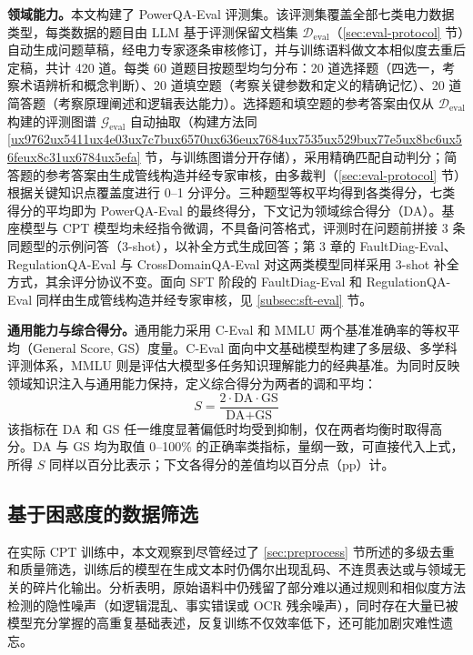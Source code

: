 \documentclass[fontset=fandol,type=master,campus=shenzhen,etitleauto=true]{hithesisbook}
\begin{document}
\textbf{领域能力。}本文构建了 PowerQA-Eval 评测集。该评测集覆盖全部七类电力数据类型，每类数据的题目由 LLM 基于评测保留文档集 $\mathcal{D}_{\text{eval}}$（\ref{sec:eval-protocol} 节）自动生成问题草稿，经电力专家逐条审核修订，并与训练语料做文本相似度去重后定稿，共计 420 道。每类 60 道题目按题型均匀分布：20 道选择题（四选一，考察术语辨析和概念判断）、20 道填空题（考察关键参数和定义的精确记忆）、20 道简答题（考察原理阐述和逻辑表达能力）。选择题和填空题的参考答案由仅从 $\mathcal{D}_{\text{eval}}$ 构建的评测图谱 $\mathcal{G}_{\text{eval}}$ 自动抽取（构建方法同 \ref{ux9762ux5411ux4e03ux7c7bux6570ux636eux7684ux7535ux529bux77e5ux8bc6ux56feux8c31ux6784ux5efa} 节，与训练图谱分开存储），采用精确匹配自动判分；简答题的参考答案由生成管线构造并经专家审核，由多裁判（\ref{sec:eval-protocol} 节）根据关键知识点覆盖度进行 0--1 分评分。三种题型等权平均得到各类得分，七类得分的平均即为 PowerQA-Eval 的最终得分，下文记为领域综合得分（DA）。基座模型与 CPT 模型均未经指令微调，不具备问答格式，评测时在问题前拼接 3 条同题型的示例问答（3-shot），以补全方式生成回答；第 3 章的 FaultDiag-Eval、RegulationQA-Eval 与 CrossDomainQA-Eval 对这两类模型同样采用 3-shot 补全方式，其余评分协议不变。面向 SFT 阶段的 FaultDiag-Eval 和 RegulationQA-Eval 同样由生成管线构造并经专家审核，见 \ref{subsec:sft-eval} 节。

\textbf{通用能力与综合得分。}通用能力采用 C-Eval 和 MMLU 两个基准准确率的等权平均（General Score, GS）度量。C-Eval 面向中文基础模型构建了多层级、多学科评测体系\cite{ref66}，MMLU 则是评估大模型多任务知识理解能力的经典基准\cite{ref67}。为同时反映领域知识注入与通用能力保持，定义综合得分为两者的调和平均：
\begin{equation}
S = \frac{2 \cdot \text{DA} \cdot \text{GS}}{\text{DA} + \text{GS}}
\end{equation}
该指标在 DA 和 GS 任一维度显著偏低时均受到抑制，仅在两者均衡时取得高分。DA 与 GS 均为取值 0--100\% 的正确率类指标，量纲一致，可直接代入上式，所得 $S$ 同样以百分比表示；下文各得分的差值均以百分点（pp）计。

\subsection{基于困惑度的数据筛选}\label{ux57faux4e8eux56f0ux60d1ux5ea6ux7684ux6570ux636eux7b5bux9009}

在实际 CPT 训练中，本文观察到尽管经过了 \ref{sec:preprocess} 节所述的多级去重和质量筛选，训练后的模型在生成文本时仍偶尔出现乱码、不连贯表达或与领域无关的碎片化输出。分析表明，原始语料中仍残留了部分难以通过规则和相似度方法检测的隐性噪声（如逻辑混乱、事实错误或 OCR 残余噪声），同时存在大量已被模型充分掌握的高重复基础表述，反复训练不仅效率低下，还可能加剧灾难性遗忘。
\end{document}
